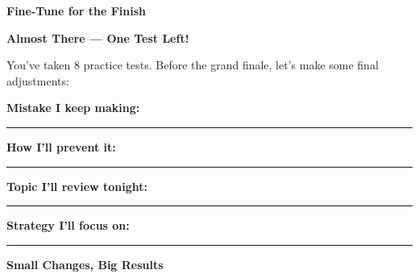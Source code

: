 \clearpage
\thispagestyle{empty}
{\sffamily

\begin{center}
{\fontsize{22}{26}\selectfont\bfseries\color{funOrange} \faSlidersH\hspace{3mm}Fine-Tune for the Finish\hspace{3mm}\faSlidersH}

\vspace{2mm}
{\color{funGray}\hrulefill}
\end{center}

\vspace{3mm}

\begin{tcolorbox}[
    enhanced,
    colback=funOrangeLight,
    colframe=funOrange!50,
    arc=10pt,
    boxrule=1.5pt,
    left=6mm, right=6mm, top=5mm, bottom=5mm,
]
{\large\bfseries\color{funOrangeDark} \faWrench\hspace{2mm}Almost There — One Test Left!}

\vspace{2mm}

You've taken 8 practice tests. Before the grand finale, let's make some final adjustments:

\vspace{3mm}

\faArrowRight\hspace{2mm}\textbf{Mistake I keep making:} \rule[-2pt]{5cm}{0.5pt}

\vspace{2mm}

\faArrowRight\hspace{2mm}\textbf{How I'll prevent it:} \rule[-2pt]{5.5cm}{0.5pt}

\vspace{2mm}

\faArrowRight\hspace{2mm}\textbf{Topic I'll review tonight:} \rule[-2pt]{5cm}{0.5pt}

\vspace{2mm}

\faArrowRight\hspace{2mm}\textbf{Strategy I'll focus on:} \rule[-2pt]{5cm}{0.5pt}
\end{tcolorbox}

\vspace{3mm}

\begin{tcolorbox}[
    enhanced,
    colback=funYellowLight,
    colframe=funYellow!60,
    arc=10pt,
    boxrule=1pt,
    left=6mm, right=6mm, top=4mm, bottom=4mm,
]
{\bfseries\color{funYellowDark} \faLightbulb\hspace{2mm}Small Changes, Big Results}


\end{tcolorbox}}
